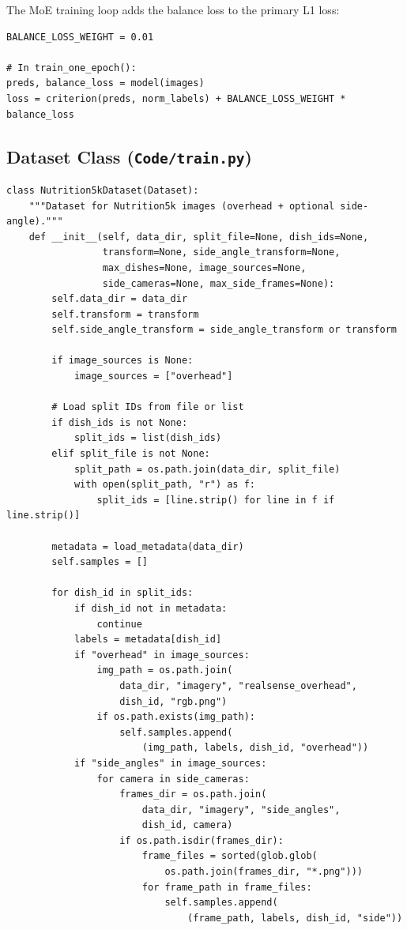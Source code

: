 \documentclass[11pt,a4paper]{article}
\begin{document}
The MoE training loop adds the balance loss to the primary L1 loss:
\begin{lstlisting}[caption={MoE training step with balance loss.}]
BALANCE_LOSS_WEIGHT = 0.01

# In train_one_epoch():
preds, balance_loss = model(images)
loss = criterion(preds, norm_labels) + BALANCE_LOSS_WEIGHT * balance_loss
\end{lstlisting}

\subsection{Dataset Class (\texttt{Code/train.py})}

\begin{lstlisting}[caption={Nutrition5kDataset --- Custom dataset for multi-view food images.}]
class Nutrition5kDataset(Dataset):
    """Dataset for Nutrition5k images (overhead + optional side-angle)."""
    def __init__(self, data_dir, split_file=None, dish_ids=None,
                 transform=None, side_angle_transform=None,
                 max_dishes=None, image_sources=None,
                 side_cameras=None, max_side_frames=None):
        self.data_dir = data_dir
        self.transform = transform
        self.side_angle_transform = side_angle_transform or transform

        if image_sources is None:
            image_sources = ["overhead"]

        # Load split IDs from file or list
        if dish_ids is not None:
            split_ids = list(dish_ids)
        elif split_file is not None:
            split_path = os.path.join(data_dir, split_file)
            with open(split_path, "r") as f:
                split_ids = [line.strip() for line in f if line.strip()]

        metadata = load_metadata(data_dir)
        self.samples = []

        for dish_id in split_ids:
            if dish_id not in metadata:
                continue
            labels = metadata[dish_id]
            if "overhead" in image_sources:
                img_path = os.path.join(
                    data_dir, "imagery", "realsense_overhead",
                    dish_id, "rgb.png")
                if os.path.exists(img_path):
                    self.samples.append(
                        (img_path, labels, dish_id, "overhead"))
            if "side_angles" in image_sources:
                for camera in side_cameras:
                    frames_dir = os.path.join(
                        data_dir, "imagery", "side_angles",
                        dish_id, camera)
                    if os.path.isdir(frames_dir):
                        frame_files = sorted(glob.glob(
                            os.path.join(frames_dir, "*.png")))
                        for frame_path in frame_files:
                            self.samples.append(
                                (frame_path, labels, dish_id, "side"))


\end{lstlisting}
\end{document}
